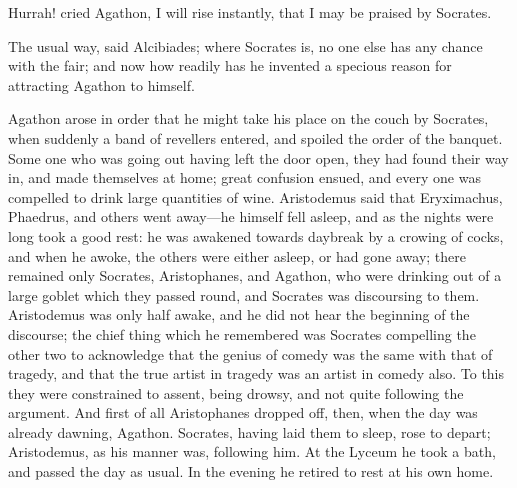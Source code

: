 \documentclass[11pt,letter]{article}
\begin{document}
\par  Hurrah! cried Agathon, I will rise instantly, that I may be praised by Socrates.

\par  The usual way, said Alcibiades; where Socrates is, no one else has any chance with the fair; and now how readily has he invented a specious reason for attracting Agathon to himself.

\par  Agathon arose in order that he might take his place on the couch by Socrates, when suddenly a band of revellers entered, and spoiled the order of the banquet. Some one who was going out having left the door open, they had found their way in, and made themselves at home; great confusion ensued, and every one was compelled to drink large quantities of wine. Aristodemus said that Eryximachus, Phaedrus, and others went away—he himself fell asleep, and as the nights were long took a good rest: he was awakened towards daybreak by a crowing of cocks, and when he awoke, the others were either asleep, or had gone away; there remained only Socrates, Aristophanes, and Agathon, who were drinking out of a large goblet which they passed round, and Socrates was discoursing to them. Aristodemus was only half awake, and he did not hear the beginning of the discourse; the chief thing which he remembered was Socrates compelling the other two to acknowledge that the genius of comedy was the same with that of tragedy, and that the true artist in tragedy was an artist in comedy also. To this they were constrained to assent, being drowsy, and not quite following the argument. And first of all Aristophanes dropped off, then, when the day was already dawning, Agathon. Socrates, having laid them to sleep, rose to depart; Aristodemus, as his manner was, following him. At the Lyceum he took a bath, and passed the day as usual. In the evening he retired to rest at his own home.

\par 
 
\end{document}
